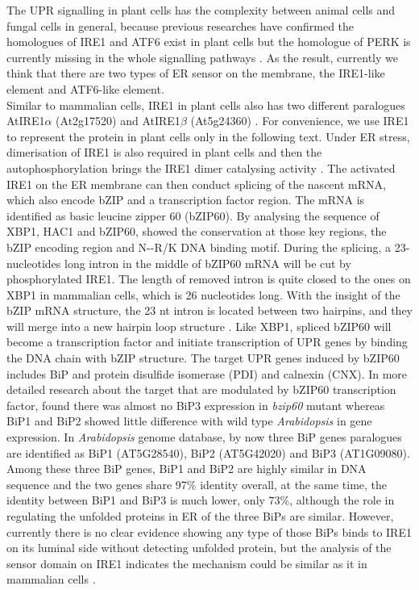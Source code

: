 The UPR signalling in plant cells has the complexity between animal cells and fungal cells in general, because previous researches have confirmed the homologues of IRE1 and ATF6 exist in plant cells but the homologue of PERK is currently missing in the whole signalling pathways \citep{howell2013endoplasmic}. As the result, currently we think that there are two types of ER sensor on the membrane, the IRE1-like element and ATF6-like element.\\
Similar to mammalian cells, IRE1 in plant cells also has two different paralogues AtIRE1$\alpha$ (At2g17520) and AtIRE1$\beta$ (At5g24360) \citep{moreno2012ire1}. For convenience, we use IRE1 to represent the protein in plant cells only in the following text. Under ER stress, dimerisation of IRE1 is also required in plant cells and then the autophosphorylation brings the IRE1 dimer catalysing activity \citep{lee2008structure}. The activated IRE1 on the ER membrane can then conduct splicing of the nascent mRNA, which also encode bZIP and a transcription factor region. The mRNA is identified as basic leucine zipper 60 (bZIP60). By analysing the sequence of XBP1, HAC1 and bZIP60, \citet{zhang2016divergence} showed the conservation at those key regions, the bZIP encoding region and N--R/K DNA binding motif. During the splicing, a 23-nucleotides long intron in the middle of bZIP60 mRNA will be cut by phosphorylated IRE1. The length of removed intron is quite closed to the ones on XBP1 in mammalian cells, which is 26 nucleotides long. With the insight of the bZIP mRNA structure, the 23 nt intron is located between two hairpins, and they will merge into a new hairpin loop structure \citep{nagashima2011arabidopsis}. Like XBP1, spliced bZIP60 will become a transcription factor and initiate transcription of UPR genes by binding the DNA chain with bZIP structure. The target UPR genes induced by bZIP60 includes BiP and protein disulfide isomerase (PDI) and calnexin (CNX). In more detailed research about the target that are modulated by bZIP60 transcription factor, \citet{iwata2008arabidopsis} found there was almost no BiP3 expression in \textit{bzip60} mutant whereas BiP1 and BiP2 showed little difference with wild type \textit{Arabidopsis} in gene expression. In \textit{Arabidopsis} genome database, by now three BiP genes paralogues are identified as BiP1 (AT5G28540), BiP2 (AT5G42020) and BiP3 (AT1G09080). Among these three BiP genes, BiP1 and BiP2 are highly similar in DNA sequence and the two genes share 97\% identity overall, at the same time, the identity between BiP1 and BiP3 is much lower, only 73\%, although the role in regulating the unfolded proteins in ER of the three BiPs are similar. However, currently there is no clear evidence showing any type of those BiPs binds to IRE1 on its luminal side without detecting unfolded protein, but the analysis of the sensor domain on IRE1 indicates the mechanism could be similar as it in mammalian cells \citep{koizumi2001molecular}.\\
